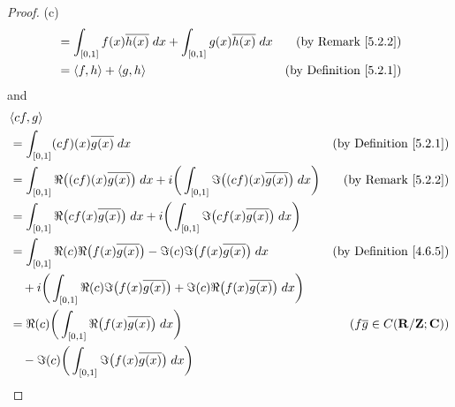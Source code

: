 \begin{proof}{(c)}
\begin{align*}
         & = \int_{[0, 1]} f(x) \overline{h(x)} \; dx + \int_{[0, 1]} g(x) \overline{h(x)} \; dx                                               & \text{(by Remark \ref{5.2.2})}                                               \\
         & = \inner*{f, h} + \inner*{g, h}                                                                                                     & \text{(by Definition \ref{5.2.1})}
    \end{align*}
    and
    \begin{align*}
         & \inner*{cf, g}                                                                                                                                                                                              \\
         & = \int_{[0, 1]} (cf)(x) \overline{g(x)} \; dx                                                                                                & \text{(by Definition \ref{5.2.1})}                           \\
         & = \int_{[0, 1]} \Re\big((cf)(x) \overline{g(x)}\big) \; dx + i \bigg(\int_{[0, 1]} \Im\big((cf)(x) \overline{g(x)}\big) \; dx\bigg)          & \text{(by Remark \ref{5.2.2})}                               \\
         & = \int_{[0, 1]} \Re\big(cf(x) \overline{g(x)}\big) \; dx + i \bigg(\int_{[0, 1]} \Im\big(cf(x) \overline{g(x)}\big) \; dx\bigg)                                                                             \\
         & = \int_{[0, 1]} \Re(c) \Re\big(f(x) \overline{g(x)}\big) - \Im(c) \Im\big(f(x) \overline{g(x)}\big) \; dx                                    & \text{(by Definition \ref{4.6.5})}                           \\
         & \quad + i \bigg(\int_{[0, 1]} \Re(c) \Im\big(f(x) \overline{g(x)}\big) + \Im(c) \Re\big(f(x) \overline{g(x)}\big) \; dx\bigg)                                                                               \\
         & = \Re(c) \bigg(\int_{[0, 1]} \Re\big(f(x) \overline{g(x)}\big) \; dx\bigg)                                                                   & (f \overline{g} \in C(\mathbf{R} / \mathbf{Z} ; \mathbf{C})) \\
         & \quad - \Im(c) \bigg(\int_{[0, 1]} \Im\big(f(x) \overline{g(x)}\big) \; dx\bigg)                                                                                                                            \\

\end{align*}
\end{proof}
